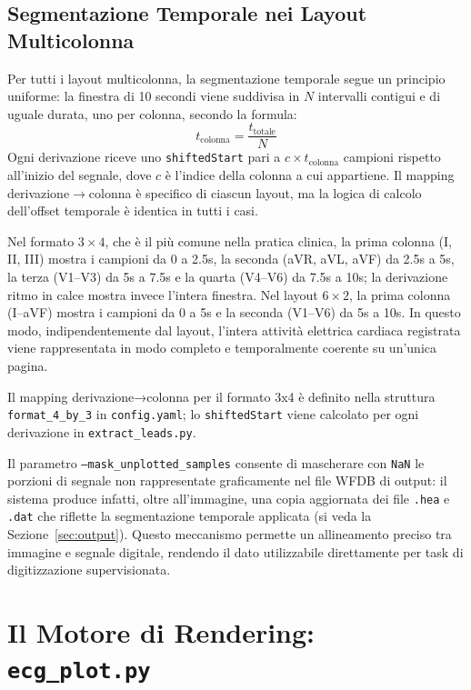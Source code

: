 \subsection{Segmentazione Temporale nei Layout Multicolonna}

Per tutti i layout multicolonna, la segmentazione temporale segue un principio uniforme: la finestra di 10 secondi viene suddivisa in $N$ intervalli contigui e di uguale durata, uno per colonna, secondo la formula:
\[
t_{\text{colonna}} = \frac{t_{\text{totale}}}{N}
\]
Ogni derivazione riceve uno \texttt{shiftedStart} pari a $c\times t_{\text{colonna}}$ campioni rispetto all'inizio del segnale, dove $c$ è l'indice della colonna a cui appartiene. Il mapping derivazione$\rightarrow$colonna è specifico di ciascun layout, ma la logica di calcolo dell'offset temporale è identica in tutti i casi.

Nel formato $3\times4$, che è il più comune nella pratica clinica, la prima colonna (I, II, III) mostra i campioni da 0 a 2.5s, la seconda (aVR, aVL, aVF) da 2.5s a 5s, la terza (V1--V3) da 5s a 7.5s e la quarta (V4--V6) da 7.5s a 10s; la derivazione ritmo in calce mostra invece l'intera finestra. Nel layout $6\times2$, la prima colonna (I--aVF) mostra i campioni da 0 a 5s e la seconda (V1--V6) da 5s a 10s. In questo modo, indipendentemente dal layout, l'intera attività elettrica cardiaca registrata viene rappresentata in modo completo e temporalmente coerente su un'unica pagina.

Il mapping derivazione→colonna per il formato 3x4 è definito nella struttura \texttt{format\_4\_by\_3} in \texttt{config.yaml}; lo \texttt{shiftedStart} viene calcolato per ogni derivazione in \texttt{extract\_leads.py}.

Il parametro \texttt{--mask\_unplotted\_samples} consente di mascherare con \texttt{NaN} le porzioni di segnale non rappresentate graficamente nel file WFDB di output: il sistema produce infatti, oltre all'immagine, una copia aggiornata dei file \texttt{.hea} e \texttt{.dat} che riflette la segmentazione temporale applicata (si veda la Sezione~\ref{sec:output}). Questo meccanismo permette un allineamento preciso tra immagine e segnale digitale, rendendo il dato utilizzabile direttamente per task di digitizzazione supervisionata.

\section{Il Motore di Rendering: \texttt{ecg\_plot.py}}

